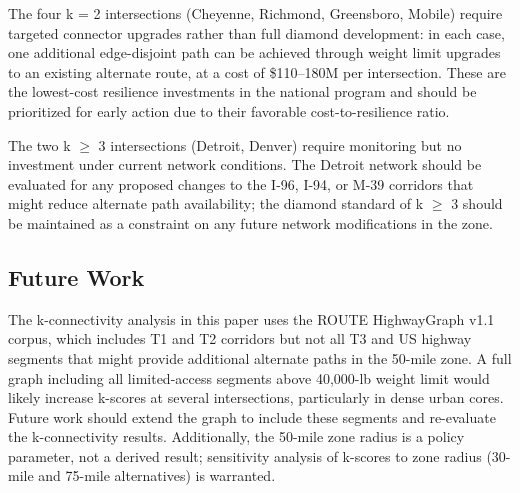 The four k = 2 intersections (Cheyenne, Richmond, Greensboro, Mobile) require targeted connector upgrades rather than full diamond development: in each case, one additional edge-disjoint path can be achieved through weight limit upgrades to an existing alternate route, at a cost of \$110--180M per intersection. These are the lowest-cost resilience investments in the national program and should be prioritized for early action due to their favorable cost-to-resilience ratio.

The two k $\geq$ 3 intersections (Detroit, Denver) require monitoring but no investment under current network conditions. The Detroit network should be evaluated for any proposed changes to the I-96, I-94, or M-39 corridors that might reduce alternate path availability; the diamond standard of k $\geq$ 3 should be maintained as a constraint on any future network modifications in the zone.

\subsection*{Future Work}

The k-connectivity analysis in this paper uses the ROUTE HighwayGraph v1.1 corpus, which includes T1 and T2 corridors but not all T3 and US highway segments that might provide additional alternate paths in the 50-mile zone. A full graph including all limited-access segments above 40,000-lb weight limit would likely increase k-scores at several intersections, particularly in dense urban cores. Future work should extend the graph to include these segments and re-evaluate the k-connectivity results. Additionally, the 50-mile zone radius is a policy parameter, not a derived result; sensitivity analysis of k-scores to zone radius (30-mile and 75-mile alternatives) is warranted.
